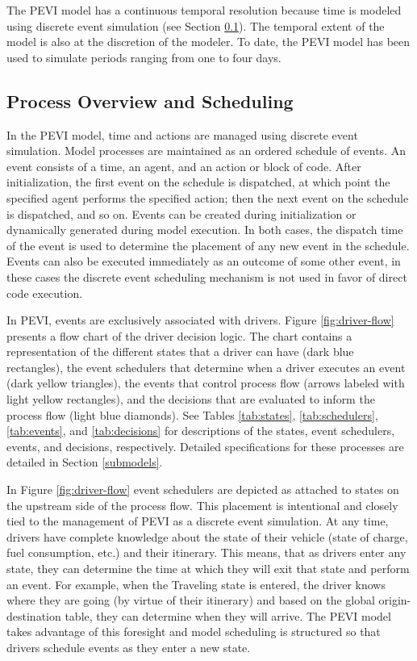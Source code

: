 \documentclass[journal]{IEEEtran}
\begin{document}
The PEVI model has a continuous temporal resolution because time is modeled using discrete event simulation (see Section \ref{scheduling}).  The temporal extent of the model is also at the discretion of the modeler.  To date, the PEVI model has been used to simulate periods ranging from one to four days. 

\subsection{Process Overview and Scheduling} \label{scheduling}

In the PEVI model, time and actions are managed using discrete event simulation.  Model processes are maintained as an ordered schedule of events.  An event consists of a time, an agent, and an action or  block of code.  After initialization, the first event on the schedule is dispatched, at which point the specified agent performs the specified action; then the next event on the schedule is dispatched, and so on.  Events can be created during initialization or dynamically generated during model execution. In both cases, the dispatch time of the event is used to determine the placement of any new event in the schedule. Events can also be executed immediately as an outcome of some other event, in these cases the discrete event scheduling mechanism is not used in favor of direct code execution. 

In PEVI, events are exclusively associated with drivers.  Figure \ref{fig:driver-flow} presents a flow chart of the driver decision logic.  The chart contains a representation of the different states that a driver can have (dark blue rectangles), the event schedulers that determine when a driver executes an event (dark yellow triangles), the events that control process flow (arrows labeled with light yellow rectangles), and the decisions that are evaluated to inform the process flow (light blue diamonds).  See Tables \ref{tab:states}, \ref{tab:schedulers}, \ref{tab:events}, and \ref{tab:decisions} for descriptions of the states, event schedulers, events, and decisions, respectively. Detailed specifications for these processes are detailed in Section \ref{submodels}. 

In Figure \ref{fig:driver-flow} event schedulers are depicted as attached to states on the upstream side of the process flow.  This placement is intentional and closely tied to the management of PEVI as a discrete event simulation.  At any time, drivers have complete knowledge about the state of their vehicle (state of charge, fuel consumption, etc.) and their itinerary.  This means, that as drivers enter any state, they can determine the time at which they will exit that state and perform an event.  For example, when the Traveling state is entered, the driver knows where they are going (by virtue of their itinerary) and based on the global origin-destination table, they can determine when they will arrive.  The PEVI model takes advantage of this foresight and model scheduling is structured so that drivers schedule events as they enter a new state. 
\end{document}
